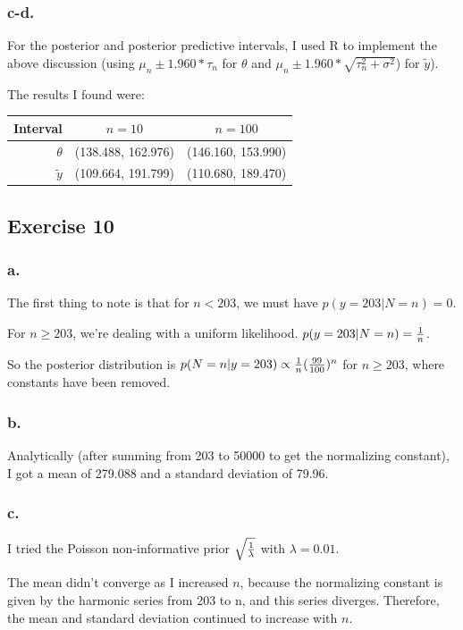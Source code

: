 \documentclass{article}
\begin{document}
\subsubsection{c-d.}

For the posterior and posterior predictive intervals, I used R to implement the above discussion (using \(\mu_n \pm 1.960*\tau_n\) for
\(\theta\) and \(\mu_n \pm 1.960*\sqrt{\tau_n^2 + \sigma^2}\)) for \(\tilde{y}\)).

The results I found were:

\begin{tabular} {| r | c | c |}
\hline
Interval &\(n = 10\)&\(n = 100\)\\ \hline
\(\theta\) &(138.488, 162.976) & (146.160, 153.990)\\ \hline
\(\tilde{y}\) &(109.664, 191.799)&(110.680, 189.470)\\ \hline
\end{tabular} 

\newpage

\subsection{Exercise 10}

\subsubsection{a.}

The first thing to note is that for \(n < 203\), we must have \(p(y = 203 \vert N=n) = 0\).

For \(n \geq 203\), we're dealing with a uniform likelihood. \(p(y = 203 \vert N=n) = {1 \over n}\).

So the posterior distribution is
\(p(N=n \vert y = 203) \propto {1 \over n}({99 \over 100})^n\) for \(n \geq 203\), where constants
have been removed.

\subsubsection{b.}

Analytically (after summing from 203 to 50000 to get the normalizing constant),
 I got a mean of 279.088 and a standard deviation of 79.96.

\subsubsection{c.}

I tried the Poisson non-informative prior \(\sqrt{1 \over \lambda}\) with \(\lambda = 0.01\).

The mean didn't converge as I increased \(n\),
because the normalizing constant is given by the harmonic series from 203 to n,
and this series diverges. Therefore, the mean and standard deviation
continued to increase with \(n\).
\end{document}
